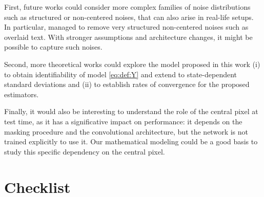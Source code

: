 \documentclass{article}
\begin{document}
First, future works could consider more complex families of noise distributions such as structured or non-centered noises, that can also arise in real-life setups. In particular, \cite{lehtinen2018noise2noise} managed to remove very structured non-centered noises such as overlaid text. With stronger assumptions and architecture changes, it might be possible to capture such noises.

Second, more theoretical works could explore the model proposed in this work  (i) to obtain identifiability of model \eqref{eq:def:Y} and extend \cite{gassiat:lecorff:lehericy:2021} to state-dependent standard deviations and (ii) to establish rates of convergence for the proposed estimators.

Finally, it would also be interesting to understand the role of the central pixel at test time, as it has a significative impact on performance: it depends on the masking procedure and the convolutional architecture, but the network is not trained explicitly to use it. Our mathematical modeling could be a good basis to study this specific dependency on the central pixel.


\FloatBarrier
\pagebreak



%


\section*{Checklist}
\end{document}

